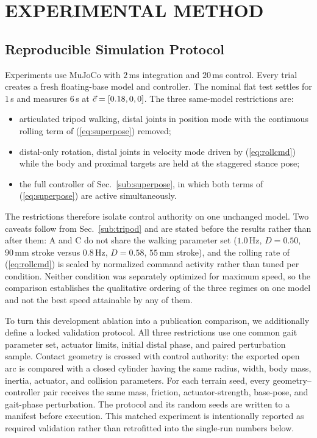 \section{EXPERIMENTAL METHOD}\label{sec:method}

\subsection{Reproducible Simulation Protocol}

Experiments use MuJoCo \cite{todorov2012mujoco} with $2\,$ms integration and
$20\,$ms control. Every trial creates a fresh floating-base model and controller.
The nominal flat test settles for $1\,$s and measures $6\,$s at
$\vec{c}=[0.18,0,0]$. The three same-model restrictions are:
\begin{itemize}\itemsep2pt
 \item[A] articulated tripod walking, distal joints in position mode with the
 continuous rolling term of (\ref{eq:superpose}) removed;
 \item[B] distal-only rotation, distal joints in velocity mode driven by
 (\ref{eq:rollcmd}) while the body and proximal targets are held at the staggered
 stance pose;
 \item[C] the full controller of Sec.~\ref{sub:superpose}, in which both terms of
 (\ref{eq:superpose}) are active simultaneously.
\end{itemize}
The restrictions therefore isolate control authority on one unchanged model. Two
caveats follow from Sec.~\ref{sub:tripod} and are stated before the results
rather than after them: A and C do not share the walking parameter set
($1.0\,$Hz, $D=0.50$, $90\,$mm stroke versus $0.8\,$Hz, $D=0.58$, $55\,$mm
stroke), and the rolling rate of (\ref{eq:rollcmd}) is scaled by normalized
command activity rather than tuned per condition. Neither condition was
separately optimized for maximum speed, so the comparison establishes the
qualitative ordering of the three regimes on one model and not the best speed
attainable by any of them.

To turn this development ablation into a publication comparison, we additionally
define a locked validation protocol. All three restrictions use one common gait
parameter set, actuator limits, initial distal phase, and paired perturbation
sample. Contact geometry is crossed with control authority: the exported open arc
is compared with a closed cylinder having the same radius, width, body mass,
inertia, actuator, and collision parameters. For each terrain seed, every
geometry--controller pair receives the same mass, friction, actuator-strength,
base-pose, and gait-phase perturbation. The protocol and its random seeds are
written to a manifest before execution. This matched experiment is intentionally
reported as required validation rather than retrofitted into the single-run
numbers below.

